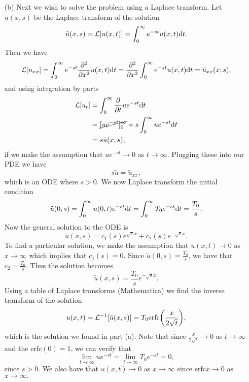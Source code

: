 \documentclass[12pt]{report}
\begin{document}
\begin{solution}
\begin{enumerate}
        
        \item [(b)]
        Next we wish to solve the problem using a Laplace transform. Let $\tilde{u}(x,s)$ be the Laplace transform of the solution
        \[
            \tilde{u}(x,s) = {\mathcal{L}}[u(x,t)] = \int_0^\infty e^{-st}u(x,t){\mathrm{d}} t.
        \]
        Then we have
        \[
            {\mathcal{L}}[u_{xx}] = \int_0^\infty e^{-st} \frac{\partial^{2} }{\partial x^{2}}u(x,t){\mathrm{d}} t = \frac{\partial^{2} }{\partial x^{2}} \int_0^\infty e^{-st} u(x,t){\mathrm{d}} t = \tilde{u}_{xx}(x,s),
        \]
        and using integration by parts
        \begin{align*}
            {\mathcal{L}}[u_{t}] &= \int_0^\infty \frac{\partial }{\partial t} u e^{-st}{\mathrm{d}} t\\
            &= \cancel{[u e^{-st}]_0^\infty} + s \int_0^\infty u e^{-st}{\mathrm{d}} t\\
            &= s \tilde{u}(x,s),
        \end{align*}
        if we make the assumption that $ue^{-st} \to 0$ as $t \to \infty$. Plugging these into our PDE we have
        \[ 
            s \tilde{u} = \tilde{u}_{xx},
        \]
        which is an ODE where $s>0$. We now Laplace transform the initial condition
        \[
            \tilde{u}(0,s) = \int_0^\infty u(0,t)e^{-st}{\mathrm{d}} t = \int_0^\infty T_0 e^{-st} {\mathrm{d}} t = \frac{T_0}{s}.
        \]
        Now the general solution to the ODE is
        \[
            \tilde{u}(x,s) = c_1(s) e^{\sqrt{s}x} + c_2(s) e^{-\sqrt{s}x}.
        \]
        To find a particular solution, we make the assumption that $u(x,t) \to 0$ as $x \to \infty$ which implies that $c_1(s) = 0$. Since $\tilde{u}(0,s) = \frac{T_0}{s}$, we have that $c_2 = \frac{T_0}{s}$. Thus the solution becomes
        \[
            \tilde{u}(x,s) = \frac{T_0}{s}e^{-\sqrt{s}x}.
        \]
        Using a table of Laplace transforms (Mathematica) we find the inverse transform of the solution 
        \[
            u(x,t) = {\mathcal{L}}^{-1}[\tilde{u}(x,s)] = T_0\text{erfc}{\left(\frac{x}{2\sqrt{t}}\right)},
        \]
        which is the solution we found in part (a). Note that since $\frac{x}{2\sqrt{t}} \to 0$ as $t \to \infty$ and the $\text{erfc}(0)=1$, we can verify that
        \[
            \lim_{t \to \infty} ue^{-st} = \lim_{t \to \infty}T_0e^{-st} = 0,
        \] 
        since $s>0$. We also have that $u(x,t) \to 0$ as $x \to \infty$ since $\text{erfc}{x} \to 0$ as $x \to \infty.$



    \end{enumerate}
\end{solution}

\newpage
\end{document}
